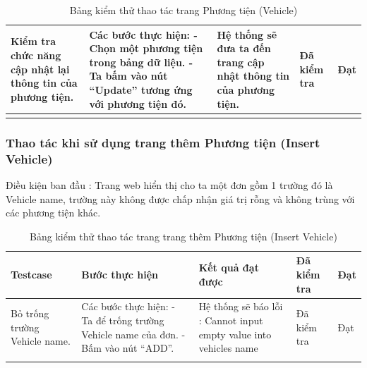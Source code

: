 \documentclass[a4paper]{article}
\begin{document}
\begin{longtable}{ | p{} |p{} | p{}  | p{}  | p{}  | }
\hline
Kiểm tra chức năng cập nhật lại thông tin của phương tiện. &
Các bước thực hiện: \newline
- Chọn một phương tiện trong bảng dữ liệu.   \newline
- Ta bấm vào nút “Update” tương ứng với phương tiện đó. 
&
Hệ thống sẽ đưa ta đến trang cập nhật thông tin của phương tiện. &
Đã kiểm tra &
Đạt \\

\hline
\caption{Bảng kiểm thử thao tác trang Phương tiện (Vehicle)}
\end{longtable}

\subsubsection*{Thao tác khi sử dụng trang thêm Phương tiện (Insert Vehicle)}
Điều kiện ban đầu : Trang web hiển thị cho ta một đơn gồm 1 trường đó là Vehicle name, trường này không được chấp nhận giá trị rỗng và không trùng với các phương tiện khác. \newline
\begin{longtable}{ | p{} |p{} | p{}  | p{}  | p{}  | } 
\hline
\textbf{Testcase}& \textbf{Bước thực hiện}& \textbf{Kết quả đạt được} & \textbf{Đã kiểm tra}& \textbf{Đạt} \\ 
\hline
\hline
Bỏ trống trường Vehicle name. &
Các bước thực hiện: \newline
- Ta để trống trường Vehicle name của đơn. \newline
- Bấm vào nút “ADD”.
&
Hệ thống sẽ báo lỗi : Cannot input empty value into vehicles name
 &
Đã kiểm tra &
Đạt \\

\hline
\caption{Bảng kiểm thử thao tác trang trang thêm Phương tiện (Insert Vehicle)}
\end{longtable}

\end{document}
